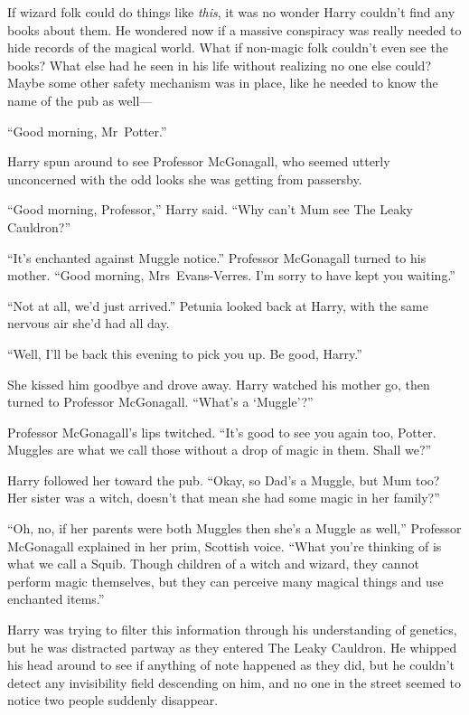 If wizard folk could do things like \emph{this}, it was no wonder
Harry couldn’t find any books about them. He wondered
now if a massive conspiracy was really needed to hide
records of the magical world. What if non-magic folk
couldn’t even see the books? What else had he seen in
his life without realizing no one else could? Maybe some
other safety mechanism was in place, like he needed to
know the name of the pub as well—

“Good morning, Mr~Potter.”

Harry spun around to see Professor McGonagall, who
seemed utterly unconcerned with the odd
looks she was getting from passersby.

“Good morning, Professor,” Harry said. “Why can’t Mum
see The Leaky Cauldron?”

“It’s enchanted against Muggle notice.” Professor McGonagall
turned to his mother. “Good morning, Mrs~Evans-Verres.
I’m sorry to have kept you waiting.”

“Not at all, we’d just arrived.” Petunia looked back at
Harry, with the same nervous air she’d had all day.

“Well, I’ll be back this evening to pick you up. Be good, Harry.”

She kissed him goodbye and drove away. Harry watched his mother
go, then turned to Professor McGonagall. “What’s a `Muggle’?”

Professor McGonagall’s lips twitched. “It’s good to see you
again too, Potter. Muggles are what we call those
without a drop of magic in them. Shall we?”

Harry followed her toward the pub. “Okay, so Dad’s a
Muggle, but Mum too? Her sister was a witch, doesn’t that
mean she had some magic in her family?”

“Oh, no, if her parents were both Muggles then she’s
a Muggle as well,” Professor McGonagall explained in her prim,
Scottish voice. “What you’re thinking of is what we call a
Squib. Though children of a witch and wizard, they cannot
perform magic themselves, but they can perceive
many magical things and use enchanted items.”

Harry was trying to filter this information through his
understanding of genetics, but he was distracted partway as
they entered The Leaky Cauldron. He whipped his head
around to see if anything of note happened as they did,
but he couldn’t detect any invisibility field descending on him,
and no one in the street seemed to notice two people
suddenly disappear.

